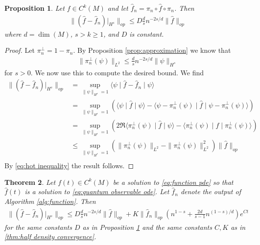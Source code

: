 \documentclass[final,leqno]{siamltex1213}
\newtheorem{thm}{Theorem}[section]
\newtheorem{prop}[thm]{Proposition}
\begin{document}
\begin{prop} \label{prop:function approximation}
	Let $f \in C^{k}(M)$ and let $\hat{f}_{n} = \pi_{n} \circ \hat{f} \circ \pi_{n}$.  Then
	\begin{align}
		\| ( \hat{f} - \hat{f}_{n} )|_{H^{s}} \|_{op} \leq D \frac{d}{s} n^{-2s/d} \| \hat{f} \|_{op}
	\end{align}
	where $d= \dim(M)$, $s > k \geq 1$, and $D$ is constant.
\end{prop}
\begin{proof}
	Let $\pi_{n}^{\perp} = 1 - \pi_{n}$.  By Proposition \ref{prop:approximation} we know that
	\begin{align}
		\| \pi_{n}^{\perp}(\psi) \|_{L^{2}} \leq \frac{d}{s} n^{-2s/d} \| \psi \|_{H^{s}} \label{eq:hot inequality}
	\end{align}
	for $s>0$.  We now use this to compute the desired bound.  We find
	\begin{align}
		\| (\hat{f} - \hat{f}_{n})|_{H^{s}} \|_{op} &= \sup_{\| \psi \|_{H^{s}}=1} \langle \psi \mid \hat{f} - \hat{f}_{n} \mid \psi \rangle \\
			&= \sup_{\| \psi \|_{H^{s}}=1} \left( \langle \psi \mid \hat{f}  \mid \psi \rangle - \langle \psi - \pi_{n}^{\perp}(\psi) \mid \hat{f} \mid \psi - \pi_{n}^{\perp}(\psi) \rangle \right) \\
			&= \sup_{\| \psi \|_{H^{s}}=1} \left( 2 \Re \langle \pi_{n}^{\perp}(\psi) \mid \hat{f} \mid \psi \rangle - \langle \pi_{n}^{\perp}(\psi) \mid \hat{f} \mid \pi_{n}^{\perp}(\psi) \rangle \right) \\
			&\leq \sup_{\| \psi \|_{H^{s}}=1}  ( \| \pi_{n}^{\perp}(\psi) \|_{L^{2}}- \| \pi_{n}^{\perp}(\psi) \|_{L^{2}}^{2} ) \| \hat{f} \|_{op} \\
	\end{align}
	By \eqref{eq:hot inequality} the result follows.
\end{proof}

\begin{thm} \label{thm:function convergence}
	Let $f(t) \in C^{k}(M)$ be a solution to \eqref{eq:function pde} so that $\hat{f}(t)$ is a solution to \eqref{eq:quantum observable ode}.
	Let $\hat{f}_{n}$ denote the output of Algorithm \ref{alg:function}.
	Then
	\begin{align}
		\| ( \hat{f} - \hat{f}_{n})|_{H^{s}} \|_{op} \leq D \frac{d}{s} n^{-2s/d} \| \hat{f} \|_{op}+  K \| \hat{f}_{n} \|_{op} \left( n^{1-s} + \frac{2d}{s -1} n^{(1-s)/d} \right) e^{Ct}
	\end{align}
	for the same constants $D$ as in Proposition \ref{prop:function approximation} and the same constants $C,K$ as in \ref{thm:half density convergence}.
\end{thm}
\end{document}
